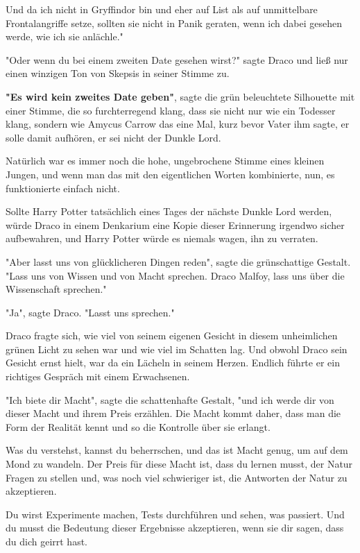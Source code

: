 {Und da ich nicht in Gryffindor bin und eher auf List als auf unmittelbare Frontalangriffe setze, sollten sie nicht in Panik geraten, wenn ich dabei gesehen werde, wie ich sie anlächle."

"Oder wenn du bei einem zweiten Date gesehen wirst?" sagte Draco und ließ nur einen winzigen Ton von Skepsis in seiner Stimme zu.

\textbf{"Es wird kein zweites Date geben"}, sagte die grün beleuchtete Silhouette mit einer Stimme, die so furchterregend klang, dass sie nicht nur wie ein Todesser klang, sondern wie Amycus Carrow das eine Mal, kurz bevor Vater ihm sagte, er solle damit aufhören, er sei nicht der Dunkle Lord.

Natürlich war es immer noch die hohe, ungebrochene Stimme eines kleinen Jungen, und wenn man das mit den eigentlichen Worten kombinierte, nun, es funktionierte einfach nicht.

Sollte Harry Potter tatsächlich eines Tages der nächste Dunkle Lord werden, würde Draco in einem Denkarium eine Kopie dieser Erinnerung irgendwo sicher aufbewahren, und Harry Potter würde es niemals wagen, ihn zu verraten.

"Aber lasst uns von glücklicheren Dingen reden", sagte die grünschattige Gestalt. "Lass uns von Wissen und von Macht sprechen. Draco Malfoy, lass uns über die Wissenschaft sprechen."

"Ja", sagte Draco. "Lasst uns sprechen."

Draco fragte sich, wie viel von seinem eigenen Gesicht in diesem unheimlichen grünen Licht zu sehen war und wie viel im Schatten lag. Und obwohl Draco sein Gesicht ernst hielt, war da ein Lächeln in seinem Herzen. Endlich führte er ein richtiges Gespräch mit einem Erwachsenen.

"Ich biete dir Macht", sagte die schattenhafte Gestalt, "und ich werde dir von dieser Macht und ihrem Preis erzählen. Die Macht kommt daher, dass man die Form der Realität kennt und so die Kontrolle über sie erlangt.

Was du verstehst, kannst du beherrschen, und das ist Macht genug, um auf dem Mond zu wandeln. Der Preis für diese Macht ist, dass du lernen musst, der Natur Fragen zu stellen und, was noch viel schwieriger ist, die Antworten der Natur zu akzeptieren.

Du wirst Experimente machen, Tests durchführen und sehen, was passiert. Und du musst die Bedeutung dieser Ergebnisse akzeptieren, wenn sie dir sagen, dass du dich geirrt hast.

}
